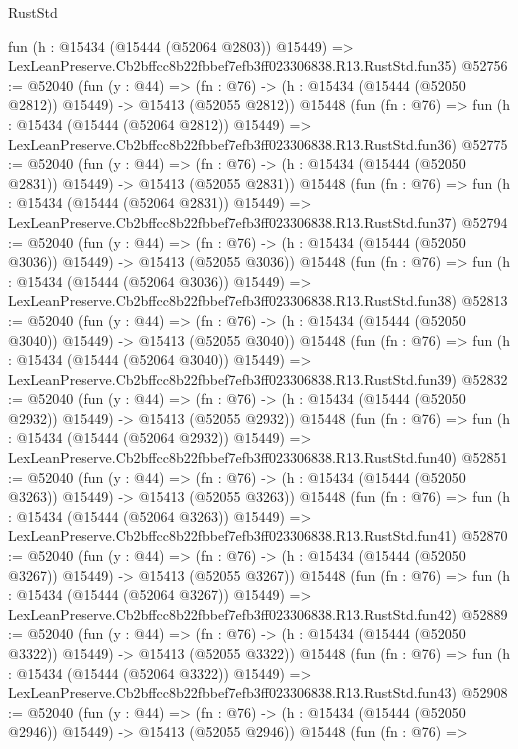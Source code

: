 \begin{lexlean}{RustStd}
\begin{coremodule}
    fun (h : @15434 (@15444 (@52064 @2803)) @15449) =>
    LexLeanPreserve.Cb2bffcc8b22fbbef7efb3ff023306838.R13.RustStd.fun35)
@52756 := @52040
    (fun (y : @44) =>
    (fn : @76) -> (h : @15434 (@15444 (@52050 @2812)) @15449) -> @15413 (@52055 @2812))
    @15448
    (fun (fn : @76) =>
    fun (h : @15434 (@15444 (@52064 @2812)) @15449) =>
    LexLeanPreserve.Cb2bffcc8b22fbbef7efb3ff023306838.R13.RustStd.fun36)
@52775 := @52040
    (fun (y : @44) =>
    (fn : @76) -> (h : @15434 (@15444 (@52050 @2831)) @15449) -> @15413 (@52055 @2831))
    @15448
    (fun (fn : @76) =>
    fun (h : @15434 (@15444 (@52064 @2831)) @15449) =>
    LexLeanPreserve.Cb2bffcc8b22fbbef7efb3ff023306838.R13.RustStd.fun37)
@52794 := @52040
    (fun (y : @44) =>
    (fn : @76) -> (h : @15434 (@15444 (@52050 @3036)) @15449) -> @15413 (@52055 @3036))
    @15448
    (fun (fn : @76) =>
    fun (h : @15434 (@15444 (@52064 @3036)) @15449) =>
    LexLeanPreserve.Cb2bffcc8b22fbbef7efb3ff023306838.R13.RustStd.fun38)
@52813 := @52040
    (fun (y : @44) =>
    (fn : @76) -> (h : @15434 (@15444 (@52050 @3040)) @15449) -> @15413 (@52055 @3040))
    @15448
    (fun (fn : @76) =>
    fun (h : @15434 (@15444 (@52064 @3040)) @15449) =>
    LexLeanPreserve.Cb2bffcc8b22fbbef7efb3ff023306838.R13.RustStd.fun39)
@52832 := @52040
    (fun (y : @44) =>
    (fn : @76) -> (h : @15434 (@15444 (@52050 @2932)) @15449) -> @15413 (@52055 @2932))
    @15448
    (fun (fn : @76) =>
    fun (h : @15434 (@15444 (@52064 @2932)) @15449) =>
    LexLeanPreserve.Cb2bffcc8b22fbbef7efb3ff023306838.R13.RustStd.fun40)
@52851 := @52040
    (fun (y : @44) =>
    (fn : @76) -> (h : @15434 (@15444 (@52050 @3263)) @15449) -> @15413 (@52055 @3263))
    @15448
    (fun (fn : @76) =>
    fun (h : @15434 (@15444 (@52064 @3263)) @15449) =>
    LexLeanPreserve.Cb2bffcc8b22fbbef7efb3ff023306838.R13.RustStd.fun41)
@52870 := @52040
    (fun (y : @44) =>
    (fn : @76) -> (h : @15434 (@15444 (@52050 @3267)) @15449) -> @15413 (@52055 @3267))
    @15448
    (fun (fn : @76) =>
    fun (h : @15434 (@15444 (@52064 @3267)) @15449) =>
    LexLeanPreserve.Cb2bffcc8b22fbbef7efb3ff023306838.R13.RustStd.fun42)
@52889 := @52040
    (fun (y : @44) =>
    (fn : @76) -> (h : @15434 (@15444 (@52050 @3322)) @15449) -> @15413 (@52055 @3322))
    @15448
    (fun (fn : @76) =>
    fun (h : @15434 (@15444 (@52064 @3322)) @15449) =>
    LexLeanPreserve.Cb2bffcc8b22fbbef7efb3ff023306838.R13.RustStd.fun43)
@52908 := @52040
    (fun (y : @44) =>
    (fn : @76) -> (h : @15434 (@15444 (@52050 @2946)) @15449) -> @15413 (@52055 @2946))
    @15448
    (fun (fn : @76) =>

\end{coremodule}
\end{lexlean}
